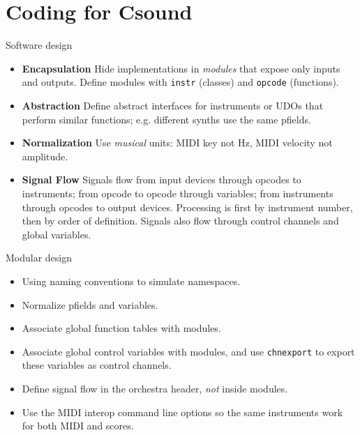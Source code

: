 \documentclass{beamer}
\begin{document}
\section{Coding for Csound}
\begin{frame}{Software design}
\begin{itemize}
\item \textbf{Encapsulation} Hide implementations in \textit{modules} that
expose only inputs and outputs. Define modules with \texttt{instr} (classes) and
\texttt{opcode} (functions).
\item \textbf{Abstraction} Define abstract interfaces for instruments or
UDOs that perform similar functions; e.g. different synths use the same
pfields.
\item \textbf{Normalization} Use \textit{musical} units: MIDI key not
Hz, MIDI velocity not amplitude.
\item \textbf{Signal Flow} Signals flow from input devices through
opcodes to instruments; from opcode to opcode through variables; from
instruments through opcodes to output devices. Processing is first by
instrument number, then by order of definition. Signals also flow through
control channels and global variables.
\end{itemize}
\end{frame}

\begin{frame}{Modular design}
\begin{itemize}
\item Using naming conventions to simulate namespaces.
\item Normalize pfields and variables.
\item Associate global function tables with modules.
\item Associate global control variables with modules, and use
\texttt{chnexport} to export these variables as control channels.
\item Define signal flow in the orchestra header, \textit{not} inside modules.
\item Use the MIDI interop command line options so the same instruments work for both MIDI and scores.
\end{itemize}
\end{frame}
\end{document}
